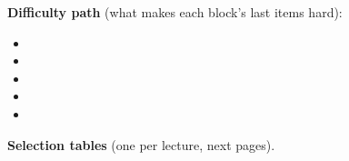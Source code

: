 \documentclass[11pt,a4paper]{article}
\begin{document}
\titulo
\howtouse

\medskip
{\small\noindent\textbf{Difficulty path} (what makes each block's last items hard):
\begin{itemize}[leftmargin=1.4em,itemsep=0pt]
\item \pathi
\item \pathii
\item \pathiii
\item \pathiv
\item \pathv
\end{itemize}\par}

\medskip
{\small\noindent\textbf{Selection tables} (one per lecture, next pages).\par}
\tablenote

\newpage
\selectiontable{\rowsi}
\selectiontable{\rowsii}
\selectiontable{\rowsiii}
\selectiontable{\rowsiv}
\selectiontable{\rowsv}

\newpage


\newpage


\newpage


\newpage


\newpage

\end{document}

